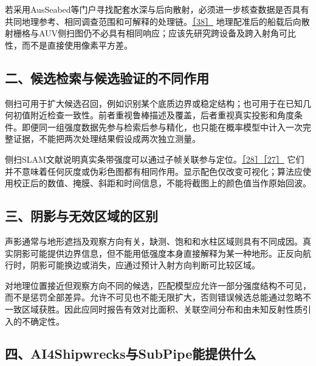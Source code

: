 若采用AusSeabed等门户寻找配套水深与后向散射，必须进一步核查数据是否具有共同地理参考、相同调查范围和可解释的处理链。\href{https://www.ausseabed.gov.au/data/bathymetry}{［38］} 地理配准后的船载后向散射栅格与AUV侧扫图仍不必具有相同响应；应该先研究跨设备及跨入射角可比性，而不是直接使用像素平方差。

\hypertarget{ux4e8cux5019ux9009ux68c0ux7d22ux4e0eux5019ux9009ux9a8cux8bc1ux7684ux4e0dux540cux4f5cux7528}{%
\subsection{二、候选检索与候选验证的不同作用}\label{ux4e8cux5019ux9009ux68c0ux7d22ux4e0eux5019ux9009ux9a8cux8bc1ux7684ux4e0dux540cux4f5cux7528}}

侧扫可用于扩大候选召回，例如识别某个底质边界或稳定结构；也可用于在已知几何初值附近检查一致性。前者重视鲁棒描述及覆盖，后者重视真实投影和角度条件。即便同一组强度数据先参与检索后参与精化，也只能在概率模型中计入一次完整证据，不能把两次处理结果假设成两次独立测量。

侧扫SLAM文献说明真实条带强度可以通过子帧关联参与定位。\href{https://arxiv.org/abs/2312.13802}{［28］}\href{https://arxiv.org/abs/2304.01854}{［27］} 它们并不意味着任何灰度或伪彩色图都有相同作用。显示配色仅改变可视化；算法应使用校正后的数值、掩膜、斜距和时间信息，不能将截图上的颜色值当作原始回波。

\hypertarget{ux4e09ux9634ux5f71ux4e0eux65e0ux6548ux533aux57dfux7684ux533aux522b}{%
\subsection{三、阴影与无效区域的区别}\label{ux4e09ux9634ux5f71ux4e0eux65e0ux6548ux533aux57dfux7684ux533aux522b}}

声影通常与地形遮挡及观察方向有关，缺测、饱和和水柱区域则具有不同成因。真实阴影可能提供边界信息，但不能用低强度本身直接解释为某一种地形。正反向航行时，阴影可能换边或消失，应通过预计入射方向判断可比较区域。

对地理位置接近但观察方向不同的候选，匹配模型应允许一部分强度结构不可见，而不是惩罚全部差异。允许不可见也不能无限扩大，否则错误候选总能通过忽略不一致区域获胜。因此应同时报告有效对比面积、关联空间分布和由未知反射性质引入的不确定性。

\hypertarget{ux56dbai4shipwrecksux4e0esubpipeux80fdux63d0ux4f9bux4ec0ux4e48}{%
\subsection{四、AI4Shipwrecks与SubPipe能提供什么}\label{ux56dbai4shipwrecksux4e0esubpipeux80fdux63d0ux4f9bux4ec0ux4e48}}

